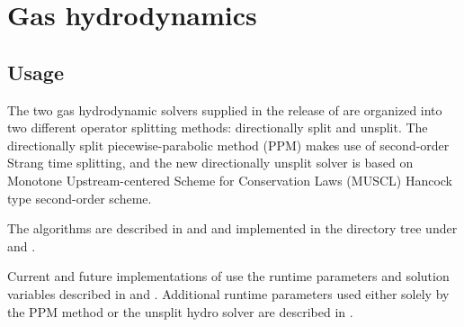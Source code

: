 \section{Gas hydrodynamics}
\subsection{Usage}
\label{Sec:PPM usage}

The two gas hydrodynamic solvers supplied in the release of
\flashx are organized into two different operator splitting methods:
directionally split and unsplit.
The directionally split piecewise-parabolic method (PPM)
makes use of second-order Strang time splitting, and the new
directionally unsplit solver is based on 
Monotone Upstream-centered Scheme for Conservation Laws (MUSCL) Hancock type
second-order scheme.


The algorithms are
described in  and  and implemented in the
directory tree under  and
.

Current and future implementations of 
use the runtime parameters and solution
variables described in  and
. 
Additional runtime parameters used either solely by the PPM method 
or the unsplit hydro solver
are described in .


